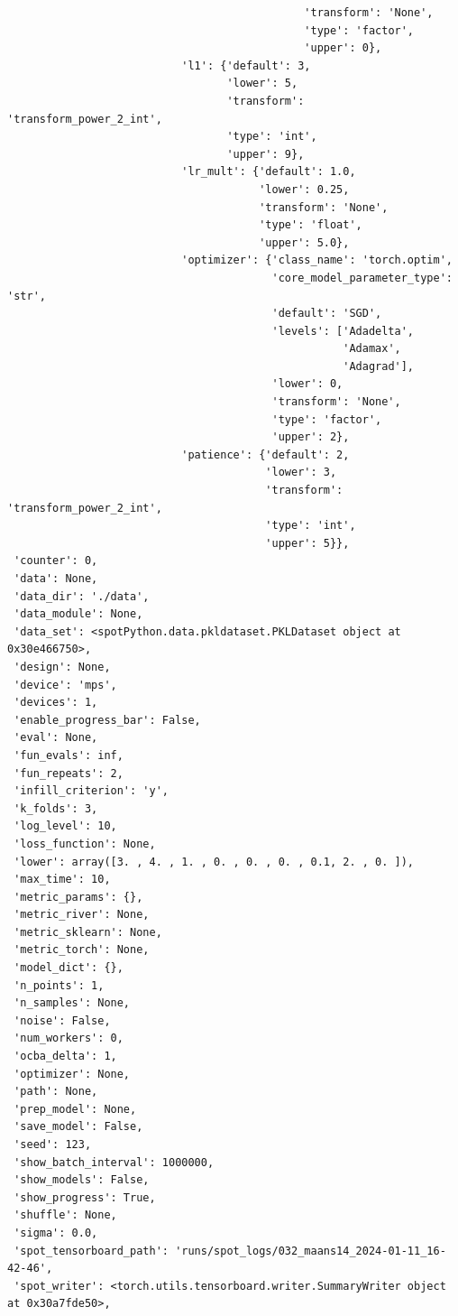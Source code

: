 \documentclass[
  letterpaper,
  DIV=11,
  numbers=noendperiod]{scrreprt}
\begin{document}
\begin{verbatim}
                                              'transform': 'None',
                                              'type': 'factor',
                                              'upper': 0},
                           'l1': {'default': 3,
                                  'lower': 5,
                                  'transform': 'transform_power_2_int',
                                  'type': 'int',
                                  'upper': 9},
                           'lr_mult': {'default': 1.0,
                                       'lower': 0.25,
                                       'transform': 'None',
                                       'type': 'float',
                                       'upper': 5.0},
                           'optimizer': {'class_name': 'torch.optim',
                                         'core_model_parameter_type': 'str',
                                         'default': 'SGD',
                                         'levels': ['Adadelta',
                                                    'Adamax',
                                                    'Adagrad'],
                                         'lower': 0,
                                         'transform': 'None',
                                         'type': 'factor',
                                         'upper': 2},
                           'patience': {'default': 2,
                                        'lower': 3,
                                        'transform': 'transform_power_2_int',
                                        'type': 'int',
                                        'upper': 5}},
 'counter': 0,
 'data': None,
 'data_dir': './data',
 'data_module': None,
 'data_set': <spotPython.data.pkldataset.PKLDataset object at 0x30e466750>,
 'design': None,
 'device': 'mps',
 'devices': 1,
 'enable_progress_bar': False,
 'eval': None,
 'fun_evals': inf,
 'fun_repeats': 2,
 'infill_criterion': 'y',
 'k_folds': 3,
 'log_level': 10,
 'loss_function': None,
 'lower': array([3. , 4. , 1. , 0. , 0. , 0. , 0.1, 2. , 0. ]),
 'max_time': 10,
 'metric_params': {},
 'metric_river': None,
 'metric_sklearn': None,
 'metric_torch': None,
 'model_dict': {},
 'n_points': 1,
 'n_samples': None,
 'noise': False,
 'num_workers': 0,
 'ocba_delta': 1,
 'optimizer': None,
 'path': None,
 'prep_model': None,
 'save_model': False,
 'seed': 123,
 'show_batch_interval': 1000000,
 'show_models': False,
 'show_progress': True,
 'shuffle': None,
 'sigma': 0.0,
 'spot_tensorboard_path': 'runs/spot_logs/032_maans14_2024-01-11_16-42-46',
 'spot_writer': <torch.utils.tensorboard.writer.SummaryWriter object at 0x30a7fde50>,

\end{verbatim}
\end{document}

